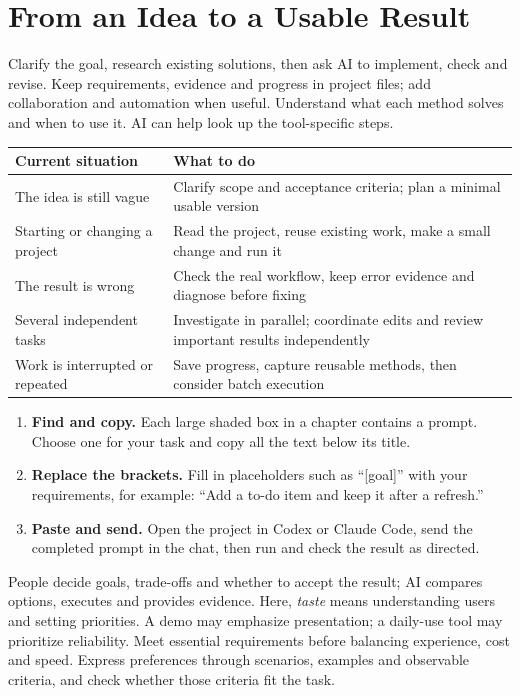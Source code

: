 \clearpage\section*{From an Idea to a Usable Result}\label{guide}
Clarify the goal, research existing solutions, then ask AI to implement, check and revise. Keep requirements, evidence and progress in project files; add collaboration and automation when useful. Understand what each method solves and when to use it. AI can help look up the tool-specific steps.
\begin{tabularx}{\linewidth}{@{}L{42mm}Y@{}}
\toprule Current situation & What to do\\\midrule
The idea is still vague & Clarify scope and acceptance criteria; plan a minimal usable version\\
Starting or changing a project & Read the project, reuse existing work, make a small change and run it\\
The result is wrong & Check the real workflow, keep error evidence and diagnose before fixing\\
Several independent tasks & Investigate in parallel; coordinate edits and review important results independently\\
Work is interrupted or repeated & Save progress, capture reusable methods, then consider batch execution\\
\bottomrule\end{tabularx}
\begin{enumerate}
\item \textbf{Find and copy.} Each large shaded box in a chapter contains a prompt. Choose one for your task and copy all the text below its title.
\item \textbf{Replace the brackets.} Fill in placeholders such as ``[goal]'' with your requirements, for example: ``Add a to-do item and keep it after a refresh.''
\item \textbf{Paste and send.} Open the project in Codex or Claude Code, send the completed prompt in the chat, then run and check the result as directed.
\end{enumerate}
People decide goals, trade-offs and whether to accept the result; AI compares options, executes and provides evidence. Here, \emph{taste} means understanding users and setting priorities. A demo may emphasize presentation; a daily-use tool may prioritize reliability. Meet essential requirements before balancing experience, cost and speed. Express preferences through scenarios, examples and observable criteria, and check whether those criteria fit the task.
